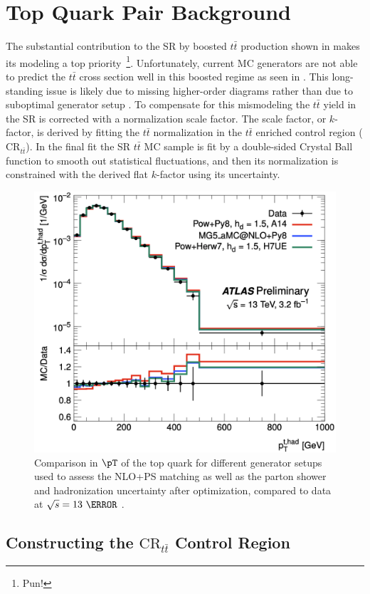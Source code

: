\section{Top Quark Pair Background} \label{sec:background:ttbar}

The substantial contribution to the SR by boosted $t\bar{t}$ production shown
in  makes its modeling a top
priority~\footnote{Pun!}.  Unfortunately, current MC generators are not able to
predict the $t\bar{t}$ cross section well in this boosted regime as seen in
.  This long-standing issue is likely due to
missing higher-order diagrams rather than due to suboptimal generator setup
\cite{ATL-PHYS-PUB-2018-009}.  To compensate for this mismodeling the
$t\bar{t}$ yield in the SR is corrected with a normalization scale factor.  The
scale factor, or $k$-factor, is derived by fitting the $t\bar{t}$ normalization
in the $t\bar{t}$ enriched control region ($\text{CR}_{t\bar{t}}$).  In the
final fit the SR $t\bar{t}$ MC sample is fit by a double-sided Crystal Ball
function \cite{Gaiser:1982yw} to smooth out statistical fluctuations, and then
its normalization is constrained with the derived flat $k$-factor using its
uncertainty.

\begin{figure}[!htbp]
\centering
\includegraphics[width=0.6\linewidth]{figures/backgrounds/mismodeling}
\caption{Comparison in $\pT$ of the top quark for different generator setups
used to assess the NLO+PS matching as well as the parton shower and
hadronization uncertainty after optimization, compared to data at $\sqrt{s} =
13~\TeV$ \cite{ATL-PHYS-PUB-2018-009}.}
\label{sec:background:mismodeling}
\end{figure}

\subsection{Constructing the $\text{CR}_{t\bar{t}}$ Control Region}

